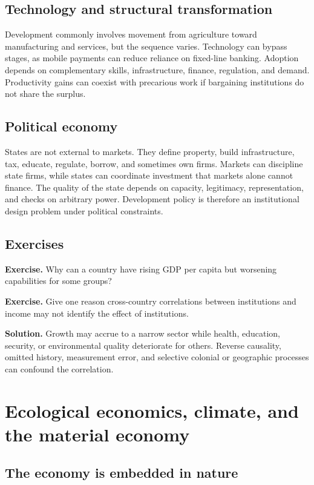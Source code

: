 \documentclass[11pt,oneside,openany]{book}
\newcommand{\exercise}[1]{\textbf{Exercise.} #1}
\newcommand{\solution}[1]{\textbf{Solution.} #1}
\begin{document}
\section{Technology and structural transformation}

Development commonly involves movement from agriculture toward manufacturing and services, but the sequence varies. Technology can bypass stages, as mobile payments can reduce reliance on fixed-line banking. Adoption depends on complementary skills, infrastructure, finance, regulation, and demand. Productivity gains can coexist with precarious work if bargaining institutions do not share the surplus.

\section{Political economy}

States are not external to markets. They define property, build infrastructure, tax, educate, regulate, borrow, and sometimes own firms. Markets can discipline state firms, while states can coordinate investment that markets alone cannot finance. The quality of the state depends on capacity, legitimacy, representation, and checks on arbitrary power. Development policy is therefore an institutional design problem under political constraints.

\section{Exercises}

\exercise{Why can a country have rising GDP per capita but worsening capabilities for some groups?}

\exercise{Give one reason cross-country correlations between institutions and income may not identify the effect of institutions.}

\solution{Growth may accrue to a narrow sector while health, education, security, or environmental quality deteriorate for others. Reverse causality, omitted history, measurement error, and selective colonial or geographic processes can confound the correlation.}

\chapter{Ecological economics, climate, and the material economy}
\label{ch:ecology}

\section{The economy is embedded in nature}
\end{document}
